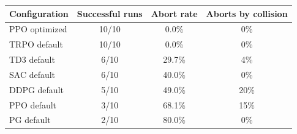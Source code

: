 \begin{tabular}{lccc}
\toprule
Configuration & Successful runs & Abort rate & Aborts by collision \\
\midrule
PPO optimized & 10/10 & 0.0\% & 0\% \\
TRPO default & 10/10 & 0.0\% & 0\% \\
TD3 default & 6/10 & 29.7\% & 4\% \\
SAC default & 6/10 & 40.0\% & 0\% \\
DDPG default & 5/10 & 49.0\% & 20\% \\
PPO default & 3/10 & 68.1\% & 15\% \\
PG default & 2/10 & 80.0\% & 0\% \\
\bottomrule
\end{tabular}
